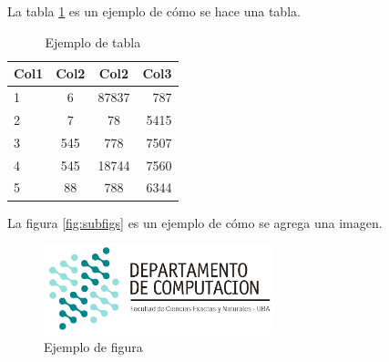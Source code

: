 \documentclass[10pt,a4paper]{article}
\begin{document}
\vspace{0.3cm}

La tabla \ref{tab:ejemplo} es un ejemplo de cómo se hace una tabla.

\begin{table}[h!]
	\centering
	\begin{tabular}{||l c c r||} 
		\hline
		Col1 & Col2 & Col2 & Col3 \\ [0.5ex] 
		\hline\hline
		1 & 6 & 87837 & 787 \\ 
		2 & 7 & 78 & 5415 \\
		3 & 545 & 778 & 7507 \\
		4 & 545 & 18744 & 7560 \\
		5 & 88 & 788 & 6344 \\
		\hline
	\end{tabular}
	\caption{Ejemplo de tabla}
	\label{tab:ejemplo}
\end{table}


La figura \ref{fig:subfigs} es un ejemplo de cómo se agrega una imagen.

\begin{figure}[ht]
	\centering
	\includegraphics[width=0.6\textwidth]{logo_dc.jpg}
	\caption{Ejemplo de figura}
	\label{fig:ejemplo}
\end{figure}
\end{document}
